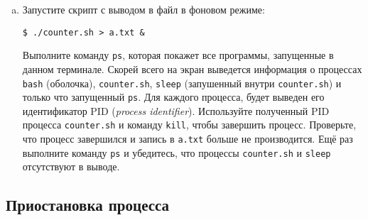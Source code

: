 \documentclass{article}
\begin{document}
\begin{enumerate}[(a)]
\item Запустите скрипт с выводом в файл в фоновом режиме:
\begin{lstlisting}
$ ./counter.sh > a.txt &
\end{lstlisting}
Выполните команду \texttt{ps}, которая покажет все программы, запущенные в данном терминале. Скорей всего на экран выведется информация о процессах \texttt{bash} (оболочка), \texttt{counter.sh}, \texttt{sleep} (запушенный внутри \texttt{counter.sh}) и только что запущенный \texttt{ps}. Для каждого процесса, будет выведен его идентификатор PID (\textit{process identifier}). Используйте полученный PID процесса \texttt{counter.sh} и команду \texttt{kill}, чтобы завершить процесс. Проверьте, что процесс завершился и запись в \texttt{a.txt} больше не производится. Ещё раз выполните команду \texttt{ps} и убедитесь, что процессы \texttt{counter.sh} и \texttt{sleep} отсутствуют в выводе.
\end{enumerate}


\subsection{Приостановка процесса}
\end{document}
